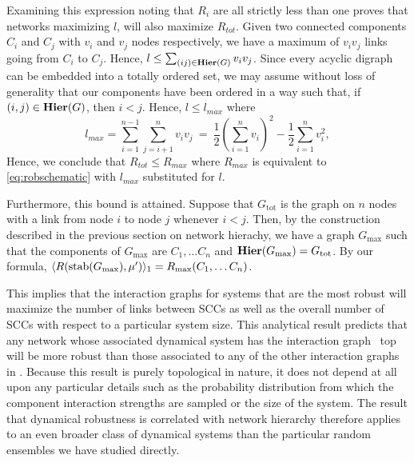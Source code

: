 Examining this expression noting that $R_i$ are all strictly less than one proves that networks maximizing $l$, will also maximize $R_{tot}$.  Given two connected components $C_i$ and $C_j$ with $v_i$ and $v_j$ nodes respectively, we have a maximum of $v_i v_j$ links going from $C_i$ to $C_j$.  Hence, $l \le \sum_{(ij) \in \mathbf{Hier}(G)} v_i v_j$.  Since every acyclic digraph can be embedded into a totally ordered
set, we may assume without loss of generality that our components have
been ordered in a way such that, if $(i,j) \in \mathbf{Hier}(G)$, then $i <
j$.  Hence, $l \le l_{max}$ where
$$l_{max} = \sum_{i=1}^{n-1}\sum_{j=i+1}^{n}v_i
v_j~=~\frac{1}{2} \left( \sum_{i=1}^{n} v_i \right)^2-\frac{1}{2} \sum_{i=1}^{n}
v_i^2,$$
Hence, we conclude that $R_{tot} \le R_{max}$ where $R_{max}$ is equivalent to \ref{eq:robschematic} with $l_{max}$ substituted for $l$.

Furthermore, this bound is attained.  Suppose that $G_{\mathrm{tot}}$
is the graph on $n$ nodes with a link from node $i$ to node $j$
whenever $i < j$.  Then, by the construction described in the previous
section on network hierachy, we have a graph $G_{\mathrm{max}}$ such
that the components of $G_{\mathrm{max}}$ are $C_1, \ldots C_n$ and
$\mathbf{Hier} (G_{\mathrm{max}}) = G_{\mathrm{tot}}$.  By our formula,
$\langle R(\hbox{stab} (G_{\mathrm{max}}), \mu') \rangle_1 = R_{\mathrm{max}}(C_1, \ldots C_n)$.

This implies that the interaction graphs for systems that are the most robust will maximize the number of links between SCCs as well as the overall number of SCCs with respect to a particular system size. This analytical result predicts that any network whose associated dynamical system has the interaction graph  $\,$ top will be more robust than those associated to any of the other interaction graphs in . Because this result is purely topological in nature, it does not depend at all upon any particular details such as the probability distribution from which the component interaction strengths are sampled or the size of the system. The result that dynamical robustness is correlated with network hierarchy therefore applies to an even broader class of dynamical systems than the particular random ensembles we have studied directly.

